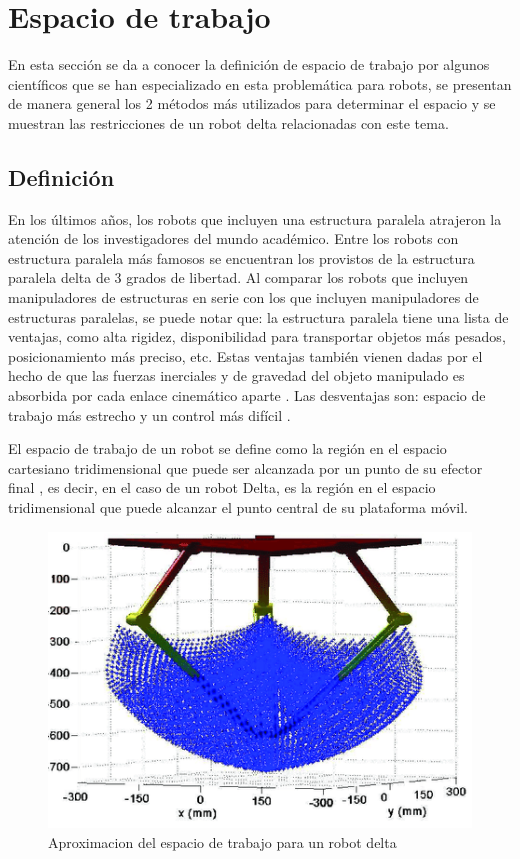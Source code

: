     \newpage

\section{Espacio de trabajo}

En esta sección se da a conocer la definición de espacio de trabajo por algunos científicos que se han especializado en esta problemática para robots, se presentan de manera general los 2 métodos más utilizados para determinar el espacio y se muestran las restricciones de un robot delta relacionadas con este tema.

    \subsection{Definición}
    En los últimos años, los robots que incluyen una estructura paralela atrajeron la atención de los investigadores del mundo académico. Entre los robots con estructura paralela más famosos se encuentran los provistos de la estructura paralela delta de 3 grados de libertad.  Al comparar los robots que incluyen manipuladores de estructuras en serie con los que incluyen manipuladores de estructuras paralelas, se puede notar que: la estructura paralela tiene una lista de ventajas, como alta rigidez, disponibilidad para transportar objetos más pesados, posicionamiento más preciso, etc. Estas ventajas también vienen dadas por el hecho de que las fuerzas inerciales y de gravedad del objeto manipulado es absorbida por cada enlace cinemático aparte \cite{Laribi08}\cite{DASH2005776}. Las desventajas son: espacio de trabajo más estrecho y un control más difícil \cite{DASH2005776}.  
    
    El espacio de trabajo de un robot se define como la región en el espacio cartesiano tridimensional que puede ser alcanzada por un punto de su efector final \cite{LARIBI2007859}, es decir, en el caso de un robot Delta, es la región en el espacio tridimensional que puede alcanzar el punto central de su plataforma móvil. 
    
    \begin{figure}[htb]
        \centering
        \includegraphics[width=0.7\linewidth]{Main/Chapter4/Images4/wsazul.png}
        \caption{Aproximacion del espacio de trabajo para un robot delta \cite{inproceedingsworkspace1}}
        \label{f:Cap4_ws_1}
    \end{figure}  
    
